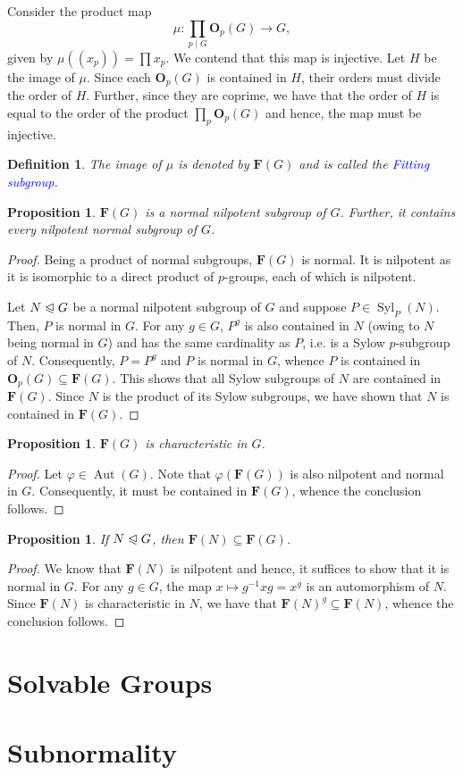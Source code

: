\documentclass[12pt]{article}
\theoremstyle{thmstyle}
\newtheorem{proposition}[theorem]{Proposition}
\theoremstyle{defstyle}
\newtheorem{definition}[theorem]{Definition}
\newcommand{\Aut}{\operatorname{Aut}}
\newcommand{\define}[1]{\textcolor{blue}{\textit{#1}}}
\newcommand{\bfO}{\mathbf{O}}
\newcommand{\bfF}{\mathbf{F}} %
\newcommand{\Syl}{\operatorname{Syl}}
\newcommand{\noreq}{\trianglelefteqslant}
\begin{document}
Consider the product map 
\begin{equation*}
    \mu: \prod_{p\mid G}\bfO_p(G)\longrightarrow G,
\end{equation*}
given by $\mu\left((x_p)\right) = \prod x_p$. We contend that this map is injective. Let $H$ be the image of $\mu$. Since each $\bfO_p(G)$ is contained in $H$, their orders must divide the order of $H$. Further, since they are coprime, we have that the order of $H$ is equal to the order of the product $\prod_p\bfO_p(G)$ and hence, the map must be injective.

\begin{definition}
    The image of $\mu$ is denoted by $\bfF(G)$ and is called the \define{Fitting subgroup}.
\end{definition}

\begin{proposition}
    $\bfF(G)$ is a normal nilpotent subgroup of $G$. Further, it contains every nilpotent normal subgroup of $G$.
\end{proposition}
\begin{proof}
    Being a product of normal subgroups, $\bfF(G)$ is normal. It is nilpotent as it is isomorphic to a direct product of $p$-groups, each of which is nilpotent.

    Let $N\noreq G$ be a normal nilpotent subgroup of $G$ and suppose $P\in\Syl_P(N)$. Then, $P$ is normal in $G$. For any $g\in G$, $P^g$ is also contained in $N$ (owing to $N$ being normal in $G$) and has the same cardinality as $P$, i.e. is a Sylow $p$-subgroup of $N$. Consequently, $P = P^g$ and $P$ is normal in $G$, whence $P$ is contained in $\bfO_p(G)\subseteq\bfF(G)$. This shows that all Sylow subgroups of $N$ are contained in $\bfF(G)$. Since $N$ is the product of its Sylow subgroups, we have shown that $N$ is contained in $\bfF(G)$.
\end{proof}

\begin{proposition}
    $\bfF(G)$ is characteristic in $G$.
\end{proposition}
\begin{proof}
    Let $\varphi\in\Aut(G)$. Note that $\varphi(\bfF(G))$ is also nilpotent and normal in $G$. Consequently, it must be contained in $\bfF(G)$, whence the conclusion follows.
\end{proof}

\begin{proposition}
    If $N\noreq G$, then $\bfF(N)\subseteq\bfF(G)$.
\end{proposition}
\begin{proof}
    We know that $\bfF(N)$ is nilpotent and hence, it suffices to show that it is normal in $G$. For any $g\in G$, the map $x\mapsto g^{-1}xg = x^g$ is an automorphism of $N$. Since $\bfF(N)$ is characteristic in $N$, we have that $\bfF(N)^g\subseteq\bfF(N)$, whence the conclusion follows.
\end{proof}

\section{Solvable Groups}


\section{Subnormality}

\end{document}
